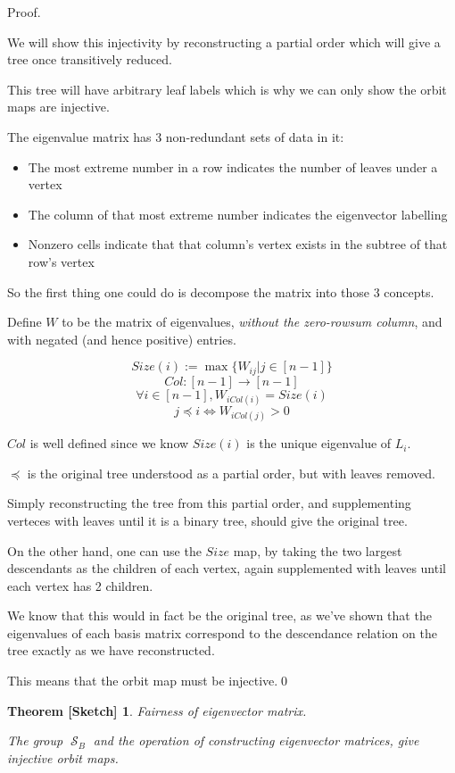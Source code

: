 \documentclass[10pt,a4paper]{report}
\DeclareMathOperator{\S}{\mathcal{S}}
\newtheorem{theorem-wip}{Theorem [Sketch]}
\begin{document}
Proof.

We will show this injectivity by reconstructing a partial order which will give a tree once transitively reduced.

This tree will have arbitrary leaf labels which is why we can only show the orbit maps are injective.

The eigenvalue matrix has 3 non-redundant sets of data in it:
\begin{itemize}
	\item The most extreme number in a row indicates the number of leaves under
		a vertex
	\item The column of that most extreme number indicates the eigenvector
		labelling
	\item Nonzero cells indicate that that column's vertex exists in the subtree
		of that row's vertex
\end{itemize}

So the first thing one could do is decompose the matrix into those 3 concepts.

Define $W$ to be the matrix of eigenvalues, \emph{without the zero-rowsum
column}, and with negated (and hence positive) entries.

\[\mathit{Size}(i) := \max\{W_{ij} | j \in [n-1]\}\]
\[\mathit{Col}: [n-1] \rightarrow [n-1]\]
\[\forall i \in [n-1], W_{i \mathit{Col}(i)} = \mathit{Size}(i)\]
\[j \preccurlyeq i \Leftrightarrow W_{i \mathit{Col}(j)} > 0\]

$\mathit{Col}$ is well defined since we know $\mathit{Size}(i)$ is the unique
eigenvalue of $L_i$.

$\preccurlyeq$ is the original tree understood as a partial order, but with
leaves removed.

Simply reconstructing the tree from this partial order, and supplementing verteces
with leaves until it is a binary tree, should give the original tree.

On the other hand, one can use the $\mathit{Size}$ map, by taking the two
largest descendants as the children of each vertex, again supplemented with
leaves until each vertex has 2 children.

We know that this would in fact be the original tree, as we've shown that the
eigenvalues of each basis matrix correspond to the descendance relation on the tree exactly as we have reconstructed.

This means that the orbit map must be injective.\qed

\begin{theorem-wip} Fairness of eigenvector matrix.

	The group $\S_B$ and the operation of constructing eigenvector matrices, give injective orbit maps.
\end{theorem-wip}
\end{document}
